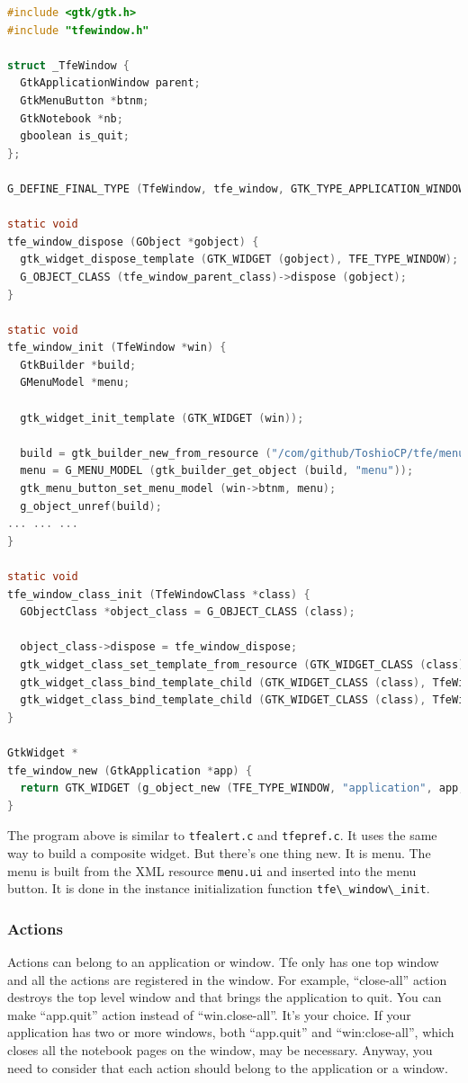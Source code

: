 \begin{lstlisting}[language=C]
#include <gtk/gtk.h>
#include "tfewindow.h"

struct _TfeWindow {
  GtkApplicationWindow parent;
  GtkMenuButton *btnm;
  GtkNotebook *nb;
  gboolean is_quit;
};

G_DEFINE_FINAL_TYPE (TfeWindow, tfe_window, GTK_TYPE_APPLICATION_WINDOW);

static void
tfe_window_dispose (GObject *gobject) {
  gtk_widget_dispose_template (GTK_WIDGET (gobject), TFE_TYPE_WINDOW);
  G_OBJECT_CLASS (tfe_window_parent_class)->dispose (gobject);
}

static void
tfe_window_init (TfeWindow *win) {
  GtkBuilder *build;
  GMenuModel *menu;

  gtk_widget_init_template (GTK_WIDGET (win));

  build = gtk_builder_new_from_resource ("/com/github/ToshioCP/tfe/menu.ui");
  menu = G_MENU_MODEL (gtk_builder_get_object (build, "menu"));
  gtk_menu_button_set_menu_model (win->btnm, menu);
  g_object_unref(build);
... ... ...
}

static void
tfe_window_class_init (TfeWindowClass *class) {
  GObjectClass *object_class = G_OBJECT_CLASS (class);

  object_class->dispose = tfe_window_dispose;
  gtk_widget_class_set_template_from_resource (GTK_WIDGET_CLASS (class), "/com/github/ToshioCP/tfe/tfewindow.ui");
  gtk_widget_class_bind_template_child (GTK_WIDGET_CLASS (class), TfeWindow, btnm);
  gtk_widget_class_bind_template_child (GTK_WIDGET_CLASS (class), TfeWindow, nb);
}

GtkWidget *
tfe_window_new (GtkApplication *app) {
  return GTK_WIDGET (g_object_new (TFE_TYPE_WINDOW, "application", app, NULL));
}
\end{lstlisting}

The program above is similar to \passthrough{\lstinline!tfealert.c!} and
\passthrough{\lstinline!tfepref.c!}. It uses the same way to build a
composite widget. But there's one thing new. It is menu. The menu is
built from the XML resource \passthrough{\lstinline!menu.ui!} and
inserted into the menu button. It is done in the instance initialization
function \passthrough{\lstinline!tfe\_window\_init!}.

\subsubsection{Actions}\label{actions}

Actions can belong to an application or window. Tfe only has one top
window and all the actions are registered in the window. For example,
``close-all'' action destroys the top level window and that brings the
application to quit. You can make ``app.quit'' action instead of
``win.close-all''. It's your choice. If your application has two or more
windows, both ``app.quit'' and ``win:close-all'', which closes all the
notebook pages on the window, may be necessary. Anyway, you need to
consider that each action should belong to the application or a window.

